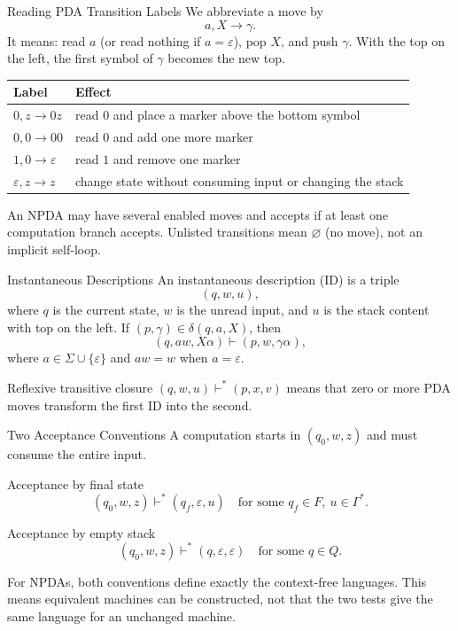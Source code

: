 \documentclass[10pt]{beamer}
\begin{document}
\begin{frame}{Reading PDA Transition Labels}
  We abbreviate a move by
  \[
    a,X\to\gamma.
  \]
  \pause
  It means: read $a$ (or read nothing if $a=\varepsilon$), pop $X$, and push
  $\gamma$. With the top on the left, the first symbol of $\gamma$ becomes the new top.
  \begin{center}
  \begin{tabular}{L{3.2cm}L{7.0cm}}
    \toprule
    Label & Effect \\
    \midrule
    $0,z\to0z$ & read $0$ and place a marker above the bottom symbol \\
    $0,0\to00$ & read $0$ and add one more marker \\
    $1,0\to\varepsilon$ & read $1$ and remove one marker \\
    $\varepsilon,z\to z$ & change state without consuming input or changing the stack \\
    \bottomrule
  \end{tabular}
  \end{center}
  An NPDA may have several enabled moves and accepts if at least one computation branch accepts.
  Unlisted transitions mean $\varnothing$ (no move), not an implicit self-loop.
\end{frame}

\begin{frame}{Instantaneous Descriptions}
  An instantaneous description (ID) is a triple
  \[
    (q,w,u),
  \]
  \pause
  where $q$ is the current state, $w$ is the unread input, and $u$ is the stack content with top on the left.
  If $(p,\gamma)\in\delta(q,a,X)$, then
  \[
    (q,aw,X\alpha)\vdash(p,w,\gamma\alpha),
  \]
  where $a\in\Sigma\cup\{\varepsilon\}$ and $aw=w$ when $a=\varepsilon$.
  \pause
  \begin{block}{Reflexive transitive closure}
    $(q,w,u)\vdash^*(p,x,v)$ means that zero or more PDA moves transform the first ID into the second.
  \end{block}
\end{frame}

\begin{frame}{Two Acceptance Conventions}
  A computation starts in $(q_0,w,z)$ and must consume the entire input.
  \begin{block}{Acceptance by final state}
    \[
      (q_0,w,z)\vdash^*(q_f,\varepsilon,u)
      \quad\text{for some }q_f\in F,\ u\in\Gamma^*.
    \]
  \end{block}
  \pause
  \begin{block}{Acceptance by empty stack}
    \[
      (q_0,w,z)\vdash^*(q,\varepsilon,\varepsilon)
      \quad\text{for some }q\in Q.
    \]
  \end{block}
  For NPDAs, both conventions define exactly the context-free languages.
  This means equivalent machines can be constructed, not that the two
  tests give the same language for an unchanged machine.
\end{frame}
\end{document}
